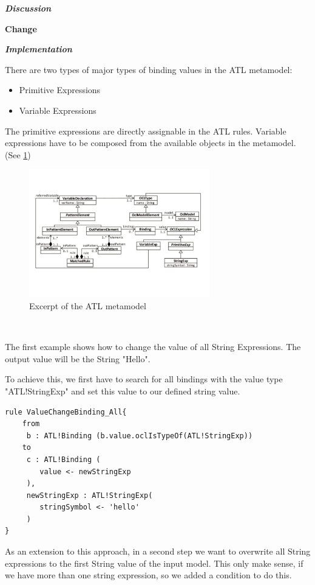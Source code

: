 \documentclass{llncs}
\begin{document}
\textbf\textit{{Discussion}}

\textbf{Change}

\textbf\textit{{Implementation}}

There are two types of major types of binding values in the ATL metamodel:

\begin{itemize}
	\item Primitive Expressions
	\item Variable Expressions
\end{itemize}

The primitive expressions are directly assignable in the ATL rules. Variable expressions have to be composed from the available objects in the metamodel. (See \ref{fig:atl_metamodel_excerpt})

\begin{figure}
	\centering
	\includegraphics[width=0.7\textwidth,natwidth=610,natheight=642]{figures/ATL_Metamodel_Excerpt}
	\caption{Excerpt of the ATL metamodel}
	\label{fig:atl_metamodel_excerpt}
\end{figure}~

The first example shows how to change the value of all String Expressions. The output value will be the String "Hello".

To achieve this, we first have to search for all bindings with the value type "ATL!StringExp" and set this value to our defined string value.

\begin{lstlisting}
rule ValueChangeBinding_All{
	from
	 b : ATL!Binding (b.value.oclIsTypeOf(ATL!StringExp))
	to
	 c : ATL!Binding (
	 	value <- newStringExp
	 ),
	 newStringExp : ATL!StringExp(
	 	stringSymbol <- 'hello'	
	 )
}
\end{lstlisting}

As an extension to this approach, in a second step we want to overwrite all String expressions to the first String value of the input model. This only make sense, if we have more than one string expression, so we added a condition to do this.
\end{document}
